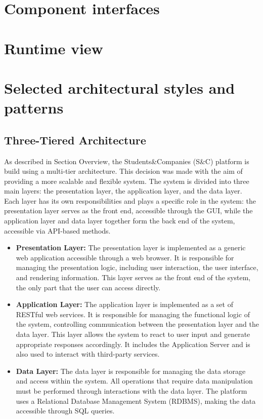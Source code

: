 \section{Component interfaces}\label{sec:component interfaces}


\section{Runtime view}\label{sec:runtime view}


\section{Selected architectural styles and patterns}\label{sec:selected architectural styles and patterns}
\subsection{Three-Tiered Architecture}\label{subsec:three-tiered architecture}
As described in Section Overview, the Students\&Companies (S\&C) platform is build using a multi-tier architecture. This decision was made with the aim of 
providing a more scalable and flexible system.
The system is divided into three main layers: the presentation layer, the application layer, and the data layer.
Each layer has its own responsibilities and plays a specific role in the system: the presentation layer serves as the front end, accessible through the GUI, 
while the application layer and data layer together form the back end of the system, accessible via API-based methods.
\begin{itemize}
    \item \textbf{Presentation Layer:} The presentation layer is implemented as a generic web application accessible through a web browser.
    It is responsible for managing the presentation logic, including user interaction, the user interface, and rendering information.
    This layer serves as the front end of the system, the only part that the user can access directly.
    \item \textbf{Application Layer:} The application layer is implemented as a set of RESTful web services.
    It is responsible for managing the functional logic of the system, controlling communication between the presentation layer and the data layer.
    This layer allows the system to react to user input and generate appropriate responses accordingly.
    It includes the Application Server and is also used to interact with third-party services.
    \item \textbf{Data Layer:} The data layer is responsible for managing the data storage and access within the system.
    All operations that require data manipulation must be performed through interactions with the data layer.
    The platform uses a Relational Database Management System (RDBMS), making the data accessible through SQL queries.
\end{itemize}
